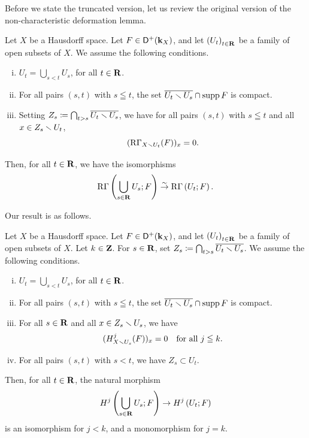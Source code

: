 Before we state the truncated version, let us review the original 
version of the non-characteristic deformation lemma.   
\begin{Proposition+}[{\cite[Proposition 2.7.2]{KS90}}]\label{prp:nonchar}
  Let \(X\) be a Hausdorff space. 
  Let \(F\in\mathop{\mathsf{D}^\mathrm{+}}\nolimits(\mathbf{k}_X)\), and let
  \(\left(U_{t}\right)_{t\in\mathbf{R}}\) be a family of 
  open subsets of \(X\). 
  We assume the following conditions. 
  \begin{enumerate}[(i)]
    \item \label{item:nonchar1}
    \(U_{t}=\bigcup_{s<t}U_{s}\), for all \(t\in\mathbf{R}\). 
    \item \label{item:nonchar2}
    For all pairs \((s,t)\) with \(s\leqq t\), 
    the set \(\overline{U_{t}\smallsetminus U_{s}}\cap \mathop{\mathrm{supp}}\nolimits{F}\) is compact.
    \item \label{item:nonchar3}
    Setting \(
      Z_{s}\coloneqq \bigcap_{t>s}\overline{U_t\smallsetminus U_s}
    \), we have
    for all pairs \((s,t)\) with \(s\leqq t\) and 
    all \(x\in Z_{s}\smallsetminus U_{t}\), 
    \[
      (\mathop{\mathrm{R}\hspace{-0pt}\Gamma}\nolimits_{X\smallsetminus U_{t}}(F))_{x}=0.
    \]
  \end{enumerate}
  Then, for all \(t\in\mathbf{R}\), we have the isomorphisms\[
    \mathop{\mathrm{R}\hspace{-0pt}\Gamma}\nolimits\left(\bigcup_{s\in\mathbf{R}}U_{s};F\right)
    \mathrel{\overset{\sim}{\rightarrow}} 
    \mathop{\mathrm{R}\hspace{-0pt}\Gamma}\nolimits\left(U_{t};F\right).
  \]
\end{Proposition+}

Our result is as follows. 

\begin{Theorem+}\label{prp:t-nonchar}
  Let \(X\) be a Hausdorff space. 
  Let \(F\in\mathop{\mathsf{D}^\mathrm{+}}\nolimits(\mathbf{k}_X)\), and let
  \(\left(U_{t}\right)_{t\in\mathbf{R}}\) be a family of 
  open subsets of \(X\). 
  Let \(k\in\mathbf{Z}\). 
  For \(s\in\mathbf{R}\), set \(
    Z_{s}\coloneqq \bigcap_{t>s}\overline{U_t\smallsetminus U_s}
  \). 
  We assume the following conditions. 
  \begin{enumerate}[(i)]
    \item \label{item:t-nonchar1}
    \(U_{t}=\bigcup_{s<t}U_{s}\), for all \(t\in\mathbf{R}\). 
    \item \label{item:t-nonchar2}
    For all pairs \((s,t)\) with \(s\leqq t\), 
    the set \(\overline{U_{t}\smallsetminus U_{s}}\cap \mathop{\mathrm{supp}}\nolimits{F}\) is compact.
    \item \label{item:t-nonchar3}
    For all \(s\in\mathbf{R}\) and all \(x\in Z_{s}\smallsetminus U_{s}\), 
    we have\[
      (H^{j}_{X\smallsetminus U_{s}}(F))_{x}=0
      \quad 
      \text{for all \(j\leqq k\).}
    \]
    \item \label{item:t-nonchar4} 
    For all pairs \((s,t)\) with \(s< t\), we have \(Z_s\subset U_{t}\).
  \end{enumerate}
  Then, for all \(t\in\mathbf{R}\), the natural morphism\[
    H^{j}\left(\bigcup_{s\in\mathbf{R}}U_{s};F\right)
    \to 
    H^{j}\left(U_{t};F\right) 
  \]
  is an isomorphism for \(j<k\), 
  and a monomorphism for \(j=k\).
\end{Theorem+}

